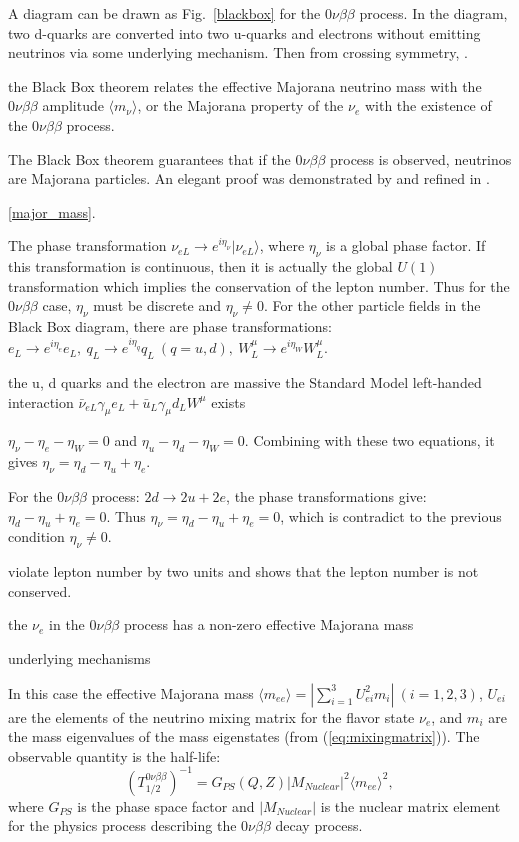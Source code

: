 A diagram can be drawn as Fig.~\ref{blackbox} for the $0\nu\beta\beta$ process.
In the diagram, two d-quarks are converted into two u-quarks and electrons without emitting neutrinos via some underlying mechanism. Then from crossing symmetry, \cite{akhmedov2014majorana}.

the Black Box theorem relates the effective Majorana neutrino mass with the $0\nu\beta\beta$ amplitude $\langle m_\nu\rangle$, or the Majorana property of the $\nu_e$ with the existence of the $0\nu\beta\beta$ process. 

The Black Box theorem guarantees that if the $0\nu\beta\beta$ process is observed, neutrinos are Majorana particles. An elegant proof was demonstrated by \cite{takasugi1984can} and refined in \cite{duerr2011quantitative,giunti2007fundamentals}. 

\ref{major_mass}.

The phase transformation $\nu_{eL}\to e^{i\eta_{\nu}}|\nu_{eL}\rangle$, where $\eta_\nu$ is a global phase factor.
If this transformation is continuous, then it is actually the global $U(1)$ transformation which implies the conservation of the lepton number. Thus for the $0\nu\beta\beta$ case, $\eta_\nu$ must be discrete and $\eta_\nu\neq 0$. For the other particle fields in the Black Box diagram, there are phase transformations: $e_L\to e^{i\eta_{e}}e_L,~q_L\to e^{i\eta_q}q_L~(q=u,d),~W^\mu_L\to e^{i\eta_W}W_L^\mu$.

the u, d quarks and the electron are massive
the Standard Model left-handed interaction $\bar{\nu}_{eL}\gamma_\mu e_L+\bar{u}_L\gamma_\mu d_L W^\mu$ exists


$\eta_\nu-\eta_e-\eta_W=0$ and $\eta_u-\eta_d-\eta_W=0$.
Combining with these two equations, it gives $\eta_\nu=\eta_d-\eta_u+\eta_e$.


For the $0\nu\beta\beta$ process: $2d\to2u+2e$, the phase transformations give: $\eta_d-\eta_u+\eta_e=0$. Thus $\eta_\nu=\eta_d-\eta_u+\eta_e=0$, which is contradict to the previous condition $\eta_\nu\neq 0$.


violate lepton number by two units and shows that the lepton number is not conserved.

the $\nu_e$ in the $0\nu\beta\beta$ process has a non-zero effective Majorana mass

underlying mechanisms 

In this case the effective Majorana mass $\langle m_{ee}\rangle=|\sum_{i=1}^{3} U_{ei}^2m_i|~(i=1,2,3)$, $U_{ei}$ are the elements of the neutrino mixing matrix for the flavor state $\nu_e$, and $m_i$ are the mass eigenvalues of the mass eigenstates (from (\ref{eq:mixingmatrix})). The observable quantity is the half-life:
\begin{equation}
(T^{0\nu\beta\beta}_{1/2})^{-1} = G_{PS}(Q,Z)|M_{Nuclear}|^2\langle m_{ee}\rangle^2, 
\end{equation}
where $G_{PS}$ is the phase space factor and $|M_{Nuclear}|$ is the nuclear matrix element for the physics process describing the $0\nu\beta\beta$ decay process\cite{zuber2020neutrino}.


